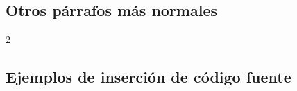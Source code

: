 	\lipsum[115]

\subsection{Otros párrafos más normales}

	\lipsum[7]


	\lipsum[2]

	\begin{multicols}{2}

		\lipsum[4]

		
		\lipsum[5]

	\end{multicols}

\subsection{Ejemplos de inserción de código fuente}

	\newcommand{\insertsrcmanual}[2]{\href{https://latex.ppizarror.com/informe.html?srctype=#1\#hlp-srccode}{#2}}

